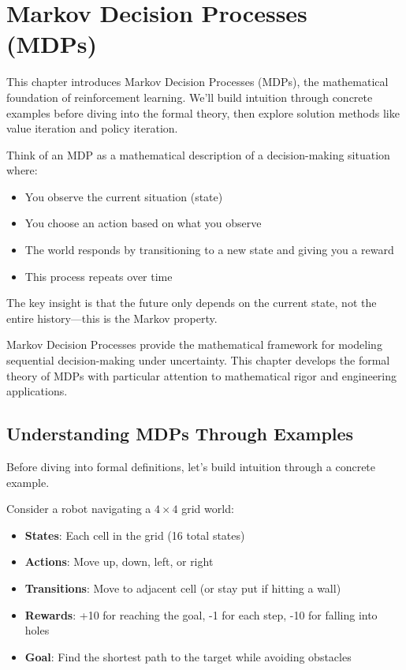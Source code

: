 \chapter{Markov Decision Processes (MDPs)}
\label{ch:mdps}

\begin{keyideabox}
This chapter introduces Markov Decision Processes (MDPs), the mathematical foundation of reinforcement learning. We'll build intuition through concrete examples before diving into the formal theory, then explore solution methods like value iteration and policy iteration.
\end{keyideabox}

\begin{intuitionbox}
Think of an MDP as a mathematical description of a decision-making situation where:
\begin{itemize}
    \item You observe the current situation (state)
    \item You choose an action based on what you observe
    \item The world responds by transitioning to a new state and giving you a reward
    \item This process repeats over time
\end{itemize}
The key insight is that the future only depends on the current state, not the entire history—this is the Markov property.
\end{intuitionbox}

Markov Decision Processes provide the mathematical framework for modeling sequential decision-making under uncertainty. This chapter develops the formal theory of MDPs with particular attention to mathematical rigor and engineering applications.

\section{Understanding MDPs Through Examples}

Before diving into formal definitions, let's build intuition through a concrete example.

\begin{examplebox}
Consider a robot navigating a $4 \times 4$ grid world:
\begin{itemize}
    \item \textbf{States}: Each cell in the grid (16 total states)
    \item \textbf{Actions}: Move up, down, left, or right
    \item \textbf{Transitions}: Move to adjacent cell (or stay put if hitting a wall)
    \item \textbf{Rewards}: +10 for reaching the goal, -1 for each step, -10 for falling into holes
    \item \textbf{Goal}: Find the shortest path to the target while avoiding obstacles
\end{itemize}
\end{examplebox}

